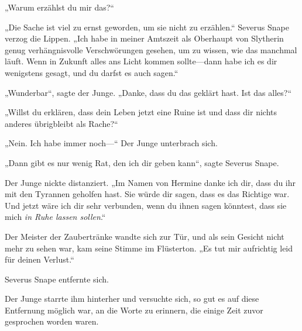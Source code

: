 „Warum erzählst du mir das?“

„Die Sache ist viel zu ernst geworden, um sie nicht zu erzählen.“ Severus Snape verzog die Lippen. „Ich habe in meiner Amtszeit als Oberhaupt von Slytherin genug verhängnisvolle Verschwörungen gesehen, um zu wissen, wie das manchmal läuft. Wenn in Zukunft alles ans Licht kommen sollte—dann habe ich es dir wenigstens gesagt, und du darfst es auch sagen.“

„Wunderbar“, sagte der Junge. „Danke, dass du das geklärt hast. Ist das alles?“

„Willst du erklären, dass dein Leben jetzt eine Ruine ist und dass dir nichts anderes übrigbleibt als Rache?“

„Nein. Ich habe immer noch—“ Der Junge unterbrach sich.

„Dann gibt es nur wenig Rat, den ich dir geben kann“, sagte Severus Snape.

Der Junge nickte distanziert. „Im Namen von Hermine danke ich dir, dass du ihr mit den Tyrannen geholfen hast. Sie würde dir sagen, dass es das Richtige war. Und jetzt wäre ich dir sehr verbunden, wenn du ihnen sagen könntest, dass sie mich \emph{in Ruhe lassen sollen}.“

Der Meister der Zaubertränke wandte sich zur Tür, und als sein Gesicht nicht mehr zu sehen war, kam seine Stimme im Flüsterton. „Es tut mir aufrichtig leid für deinen Verlust.“

Severus Snape entfernte sich.

Der Junge starrte ihm hinterher und versuchte sich, so gut es auf diese Entfernung möglich war, an die Worte zu erinnern, die einige Zeit zuvor gesprochen worden waren.


